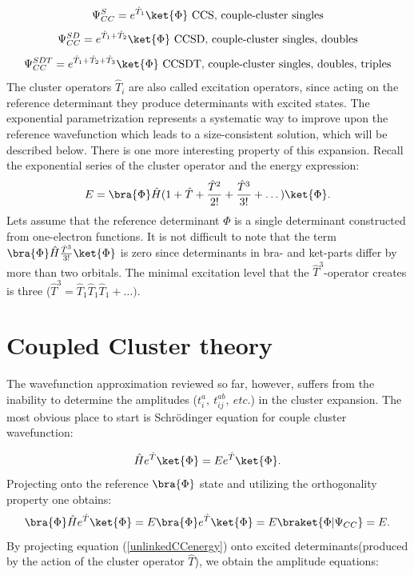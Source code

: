 \documentclass[twoside,english]{uiofysmaster}
\begin{document}
\begin{equation*}
\Psi_{CC}^{S} =  e^{\hat{T}_1}\ket{\Phi} \ \text{CCS, couple-cluster singles}
\end{equation*}
\begin{equation*}
\Psi_{CC}^{SD} =  e^{\hat{T}_1 + \hat{T}_2}\ket{\Phi} \ \text{CCSD, couple-cluster singles, doubles}
\end{equation*}
\begin{equation*}
\Psi_{CC}^{SDT} =  e^{\hat{T}_1 + \hat{T}_2 + \hat{T}_3}\ket{\Phi} \ \text{CCSDT, couple-cluster singles, doubles, triples}
\end{equation*}
The cluster operators $\hat{T}_i$ are also called excitation operators, since acting on the reference determinant they produce determinants with excited states.
The exponential parametrization represents a systematic way to improve upon the reference wavefunction which leads to a size-consistent solution, which will be described below.
There is one more interesting property of this expansion. Recall the exponential series of the  cluster operator and the energy expression:
\begin{equation}
	E = \bra{\Phi} \hat{H}(1 + \hat{T} + \frac{\hat{T}^2}{2!} + \frac{\hat{T}^3}{3!} + \dots) \ket{\Phi}.
\end{equation}
Lets assume that the reference determinant $\Phi$ is a single determinant constructed from one-electron functions. It is not difficult to note that the term $\bra{\Phi} \hat{H}\frac{\hat{T}^3}{3!}\ket{\Phi} $ is zero since determinants in bra- and ket-parts differ by more than two orbitals. The minimal excitation level that the $\hat{T}^3$-operator creates is three ($\hat{T}^3 = \hat{T}_1\hat{T}_1\hat{T}_1 + \dots)$.


\section{Coupled Cluster theory}

The wavefunction approximation reviewed so far, however, suffers from the inability to determine the amplitudes ($t_i^a,\ t_{ij}^{ab},\ etc.$) in the cluster expansion. The most obvious place to start is Schr\"{o}dinger equation for couple cluster wavefunction: 

\begin{equation}\label{unlinkedCCenergy}
\hat{H}e^{\hat{T}}\ket{\Phi} = Ee^{\hat{T}}\ket{\Phi}.	
\end{equation}
Projecting onto the reference $\bra{\Phi}$ state and utilizing the orthogonality property one obtains:	
\begin{equation}\label{unlinkedCCamplts}
\bra{\Phi}\hat{H}e^{\hat{T}}\ket{\Phi} = E\bra{\Phi}e^{\hat{T}}\ket{\Phi} = E\braket{\Phi|\Psi_{CC}} = E.
\end{equation}		
By projecting equation (\ref{unlinkedCCenergy}) onto excited determinants(produced by the action of the cluster operator $\hat{T}$), we obtain the amplitude equations:
\end{document}
